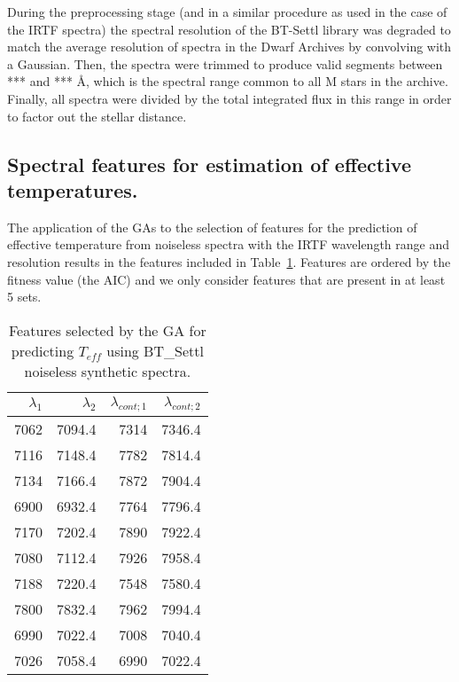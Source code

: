 
During the preprocessing stage (and in a similar procedure as used in
the case of the IRTF spectra) the spectral resolution of the BT-Settl
library was degraded to match the average resolution of spectra in the
Dwarf Archives by convolving with a Gaussian. Then, the spectra were
trimmed to produce valid segments between *** and *** {\AA}, which is
the spectral range common to all M stars in the archive. Finally, all
spectra were divided by the total integrated flux in this range in
order to factor out the stellar distance.

\subsection{Spectral features for estimation of effective temperatures.}

The application of the GAs to the selection of features for the
prediction of effective temperature from noiseless spectra with the
IRTF wavelength range and resolution results in the features included
in Table~\ref{tab:tab_NC_T}. Features are ordered by the fitness value
(the AIC) and we only consider features that are present in at least 5
sets.

\begin{table}
\begin{center}
\begin{tabular}{rrrr}
  \hline
  $\lambda_1$ & $\lambda_2$ & $\lambda_{cont;1}$ & $\lambda_{cont;2} $ \\ 
  \hline
7062 & 7094.4 &	7314 & 7346.4 \\
7116 & 7148.4 &	7782 & 7814.4 \\
7134 & 7166.4 &	7872 & 7904.4 \\
6900 & 6932.4 &	7764 & 7796.4 \\
7170 & 7202.4 &	7890 & 7922.4 \\
7080 & 7112.4 &	7926 & 7958.4 \\
7188 & 7220.4 &	7548 & 7580.4 \\
7800 & 7832.4 &	7962 & 7994.4 \\
6990 & 7022.4 &	7008 & 7040.4 \\
7026 & 7058.4 &	6990 & 7022.4 \\
\hline
\end{tabular}
\caption {Features selected by the GA for predicting $T_{eff}$ 
      using BT\_Settl noiseless synthetic
      spectra. } \label{tab:tab_NC_T}
\end{center}
\end{table}

